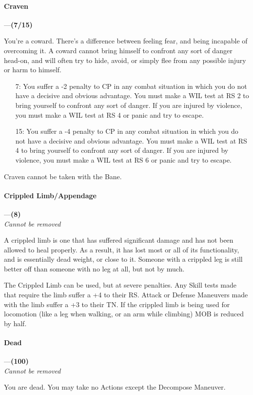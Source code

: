 \documentclass[oneside,11pt,english]{book}
\begin{document}
\paragraph{\label{bane:Craven}Craven}---\quad\textbf{(7/15) }\par
You're a coward. There's a difference between feeling fear, and being incapable of overcoming it. A coward cannot bring himself to confront any sort of danger head-on, and will often try to hide, avoid, or 
simply flee from any possible injury or harm to himself. 

\begin{itemize}
	\item [7:] You suffer a -2 penalty to CP in any combat situation in which you do not have a decisive and obvious advantage. You must make a WIL test at RS 2 to bring yourself to confront any sort of danger. If you are injured by violence, you must make a WIL test at RS 4 or panic and try to escape. 
	\item [15:] You suffer a -4 penalty to CP in any combat situation in which you do not have a decisive and obvious advantage. You must make a WIL test at RS 4 to bring yourself to confront any sort of danger. If you are injured by violence, you must make a WIL test at RS 6 or panic and try to escape.
\end{itemize}
Craven cannot be taken with the  Bane.
\paragraph{\label{bane:Crippled Limb/Appendage}Crippled Limb/Appendage}---\quad\textbf{(8)}\\
\textit{Cannot be removed}\par
A crippled limb is one that has suffered significant damage and has not been allowed to heal properly. As 
a result, it has lost most or all of its functionality, and is essentially dead weight, or close to it. Someone with a crippled leg is still better off than someone with no leg at all, but not by much.


The Crippled Limb can be used, but at severe penalties. Any Skill tests made that require the limb suffer a +4 to their RS. Attack or Defense Maneuvers made with the limb suffer a +3 to their TN. If the crippled limb is being used for locomotion (like a leg when walking, or an arm while climbing) MOB is reduced by half.
\paragraph{\label{bane:Dead}Dead}---\quad\textbf{(100) }\\
\textit{Cannot be removed}\par
You are dead. You may take no Actions except the Decompose Maneuver.
\end{document}
